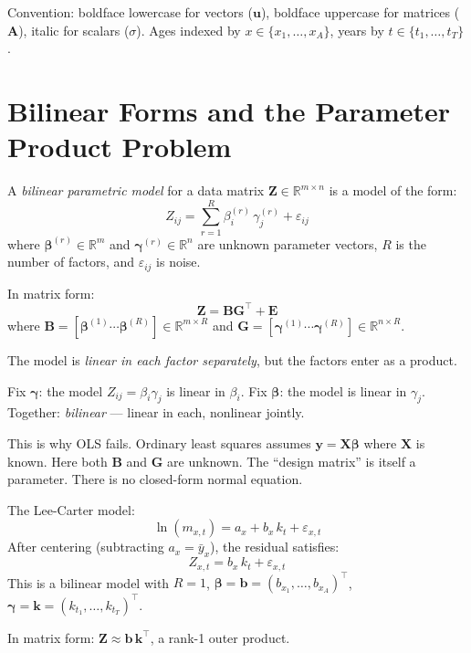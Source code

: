 \documentclass[11pt,a4paper]{article}
\begin{document}
\vspace{1em}

Convention: boldface lowercase for vectors ($\bm{u}$), boldface uppercase for matrices ($\bm{A}$),
italic for scalars ($\sigma$). Ages indexed by $x \in \{x_1, \ldots, x_A\}$,
years by $t \in \{t_1, \ldots, t_T\}$.

\section{Bilinear Forms and the Parameter Product Problem}

\begin{formaldef}
A \emph{bilinear parametric model} for a data matrix $\bm{Z} \in \mathbb{R}^{m \times n}$ is a model of the form:
\[
Z_{ij} = \sum_{r=1}^{R} \beta_i^{(r)} \, \gamma_j^{(r)} + \varepsilon_{ij}
\]
where $\bm{\beta}^{(r)} \in \mathbb{R}^m$ and $\bm{\gamma}^{(r)} \in \mathbb{R}^n$ are unknown parameter vectors,
$R$ is the number of factors, and $\varepsilon_{ij}$ is noise.

In matrix form:
\[
\bm{Z} = \bm{B} \bm{G}^\top + \bm{E}
\]
where $\bm{B} = [\bm{\beta}^{(1)} \cdots \bm{\beta}^{(R)}] \in \mathbb{R}^{m \times R}$
and $\bm{G} = [\bm{\gamma}^{(1)} \cdots \bm{\gamma}^{(R)}] \in \mathbb{R}^{n \times R}$.
\end{formaldef}

\begin{intuition}
The model is \emph{linear in each factor separately}, but the factors enter as a product.

Fix $\bm{\gamma}$: the model $Z_{ij} = \beta_i \gamma_j$ is linear in $\beta_i$.
Fix $\bm{\beta}$: the model is linear in $\gamma_j$.
Together: \emph{bilinear} --- linear in each, nonlinear jointly.

This is why OLS fails. Ordinary least squares assumes $\bm{y} = \bm{X}\bm{\beta}$ where
$\bm{X}$ is known. Here both $\bm{B}$ and $\bm{G}$ are unknown. The ``design matrix''
is itself a parameter. There is no closed-form normal equation.
\end{intuition}

\begin{application}
The Lee-Carter model:
\[
\ln(m_{x,t}) = a_x + b_x \, k_t + \varepsilon_{x,t}
\]
After centering (subtracting $a_x = \bar{y}_x$), the residual satisfies:
\[
Z_{x,t} = b_x \, k_t + \varepsilon_{x,t}
\]
This is a bilinear model with $R = 1$, $\bm{\beta} = \bm{b} = (b_{x_1}, \ldots, b_{x_A})^\top$,
$\bm{\gamma} = \bm{k} = (k_{t_1}, \ldots, k_{t_T})^\top$.

In matrix form: $\bm{Z} \approx \bm{b}\,\bm{k}^\top$, a rank-1 outer product.
\end{application}
\end{document}

